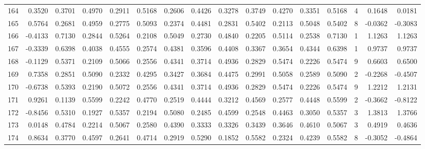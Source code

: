 \begin{tabular}{lrrrrrrrrrrrrrrr}
164 &      0.3520 &  0.3701 &  0.4970 &  0.2911 &  0.5168 &  0.2606 &  0.4426 &  0.3278 &  0.3749 &  0.4270 &   0.3351 &     0.5168 &      4 &                    0.1648 &                     0.0181 \\
165 &      0.5764 &  0.2681 &  0.4959 &  0.2775 &  0.5093 &  0.2374 &  0.4481 &  0.2831 &  0.5402 &  0.2113 &   0.5048 &     0.5402 &      8 &                   -0.0362 &                    -0.3083 \\
166 &     -0.4133 &  0.7130 &  0.2844 &  0.5264 &  0.2108 &  0.5049 &  0.2730 &  0.4840 &  0.2205 &  0.5114 &   0.2538 &     0.7130 &      1 &                    1.1263 &                     1.1263 \\
167 &     -0.3339 &  0.6398 &  0.4038 &  0.4555 &  0.2574 &  0.4381 &  0.3596 &  0.4408 &  0.3367 &  0.3654 &   0.4344 &     0.6398 &      1 &                    0.9737 &                     0.9737 \\
168 &     -0.1129 &  0.5371 &  0.2109 &  0.5066 &  0.2556 &  0.4341 &  0.3714 &  0.4936 &  0.2829 &  0.5474 &   0.2226 &     0.5474 &      9 &                    0.6603 &                     0.6500 \\
169 &      0.7358 &  0.2851 &  0.5090 &  0.2332 &  0.4295 &  0.3427 &  0.3684 &  0.4475 &  0.2991 &  0.5058 &   0.2589 &     0.5090 &      2 &                   -0.2268 &                    -0.4507 \\
170 &     -0.6738 &  0.5393 &  0.2190 &  0.5072 &  0.2556 &  0.4341 &  0.3714 &  0.4936 &  0.2829 &  0.5474 &   0.2226 &     0.5474 &      9 &                    1.2212 &                     1.2131 \\
171 &      0.9261 &  0.1139 &  0.5599 &  0.2242 &  0.4770 &  0.2519 &  0.4444 &  0.3212 &  0.4569 &  0.2577 &   0.4448 &     0.5599 &      2 &                   -0.3662 &                    -0.8122 \\
172 &     -0.8456 &  0.5310 &  0.1927 &  0.5357 &  0.2194 &  0.5080 &  0.2485 &  0.4599 &  0.2548 &  0.4463 &   0.3050 &     0.5357 &      3 &                    1.3813 &                     1.3766 \\
173 &      0.0148 &  0.4784 &  0.2214 &  0.5067 &  0.2580 &  0.4390 &  0.3333 &  0.3326 &  0.3439 &  0.3646 &   0.4610 &     0.5067 &      3 &                    0.4919 &                     0.4636 \\
174 &      0.8634 &  0.3770 &  0.4597 &  0.2641 &  0.4714 &  0.2919 &  0.5290 &  0.1852 &  0.5582 &  0.2324 &   0.4239 &     0.5582 &      8 &                   -0.3052 &                    -0.4864 \\

\end{tabular}
